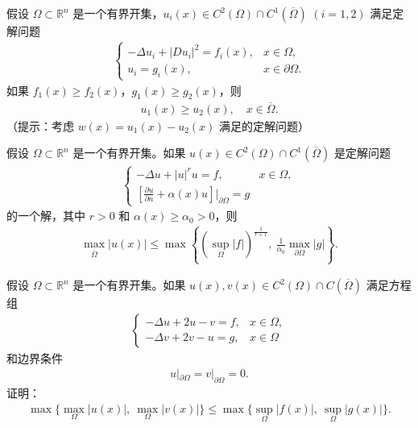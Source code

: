 \documentclass[../../main.tex]{subfiles}%
\begin{document}
\begin{example}
假设 $\Omega\subset\mathbb{R}^n$ 是一个有界开集，$u_i(x)\in C^2(\Omega)\cap C^1(\overline{\Omega})$ $(i=1,2)$ 满足定解问题
\begin{align*}
\begin{cases}
-\Delta u_i + |Du_i|^2 = f_i(x), & x\in\Omega, \\
u_i = g_i(x), & x\in\partial\Omega.
\end{cases}
\end{align*}
如果 $f_1(x)\geqslant f_2(x)$，$g_1(x)\geqslant g_2(x)$，则
\begin{align*}
u_1(x)\geqslant u_2(x),\quad x\in\overline{\Omega}.
\end{align*}
（提示：考虑 $w(x)=u_1(x)-u_2(x)$ 满足的定解问题）
\end{example}

\begin{example}
假设 $\Omega\subset\mathbb{R}^n$ 是一个有界开集。如果 $u(x)\in C^2(\Omega)\cap C^1(\overline{\Omega})$ 是定解问题
\begin{align*}
\begin{cases}
-\Delta u + |u|^r u = f, & x\in\Omega, \\
\left[\frac{\partial u}{\partial n} + \alpha(x)u\right]\bigg|_{\partial\Omega} = g
\end{cases}
\end{align*}
的一个解，其中 $r>0$ 和 $\alpha(x)\geqslant\alpha_0>0$，则
\begin{align*}
\max_{\overline{\Omega}} |u(x)| \leqslant \max\left\{ \left(\sup_{\Omega}|f|\right)^{\frac{1}{r+1}},\ \frac{1}{\alpha_0}\max_{\partial\Omega}|g| \right\}.
\end{align*}
\end{example}

\begin{example}
假设 $\Omega\subset\mathbb{R}^n$ 是一个有界开集。如果 $u(x),v(x)\in C^2(\Omega)\cap C(\overline{\Omega})$ 满足方程组
\begin{align*}
\begin{cases}
-\Delta u + 2u - v = f, & x\in\Omega, \\
-\Delta v + 2v - u = g, & x\in\Omega
\end{cases}
\end{align*}
和边界条件
\begin{align*}
u|_{\partial\Omega} = v|_{\partial\Omega} = 0.
\end{align*}
证明：
\begin{align*}
\max\{ \max_{\Omega}|u(x)|,\ \max_{\Omega}|v(x)| \} \leqslant \max\{ \sup_{\Omega}|f(x)|,\ \sup_{\Omega}|g(x)| \}.
\end{align*}
\end{example}
\end{document}
